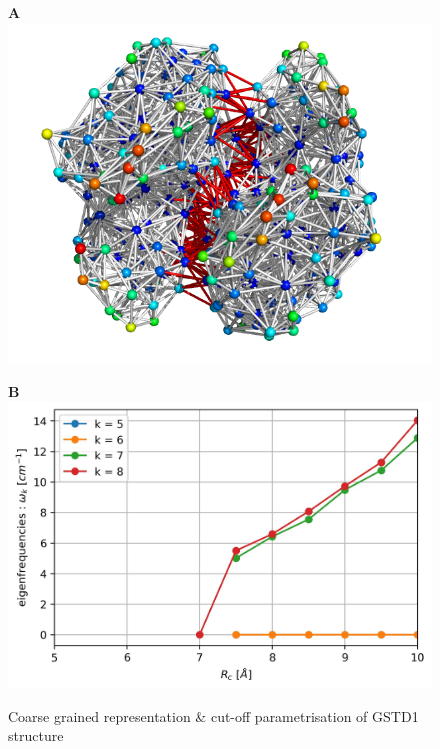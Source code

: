 \begin{figure}[h!]
	\label{Rc param}
	\begin{minipage}{.48\linewidth}
		\textbf{A}\\
		\includegraphics[width = .99\linewidth]{figures/GSTD1_ElasticNetwork.png}
	\end{minipage}	
	\begin{minipage}{.48\linewidth}
		\textbf{B}\\
		\includegraphics[width = .99\linewidth]{figures/GSTD1_ANM-COM_Rc_param.jpg}\\[.5cm]
	\end{minipage}	
	\caption{Coarse grained representation \& cut-off parametrisation of GSTD1 structure}	
\end{figure}

